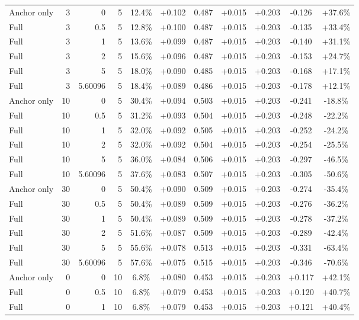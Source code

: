 \begin{table}[htbp]
\begin{tabular}{lrrrccccccc}
Anchor only & 3 & 0 & 5 & 12.4\% & +0.102 & 0.487 & +0.015 & +0.203 & -0.126 & +37.6\% \\
Full & 3 & 0.5 & 5 & 12.8\% & +0.100 & 0.487 & +0.015 & +0.203 & -0.135 & +33.4\% \\
Full & 3 & 1 & 5 & 13.6\% & +0.099 & 0.487 & +0.015 & +0.203 & -0.140 & +31.1\% \\
Full & 3 & 2 & 5 & 15.6\% & +0.096 & 0.487 & +0.015 & +0.203 & -0.153 & +24.7\% \\
Full & 3 & 5 & 5 & 18.0\% & +0.090 & 0.485 & +0.015 & +0.203 & -0.168 & +17.1\% \\
Full & 3 & 5.60096 & 5 & 18.4\% & +0.089 & 0.486 & +0.015 & +0.203 & -0.178 & +12.1\% \\
Anchor only & 10 & 0 & 5 & 30.4\% & +0.094 & 0.503 & +0.015 & +0.203 & -0.241 & -18.8\% \\
Full & 10 & 0.5 & 5 & 31.2\% & +0.093 & 0.504 & +0.015 & +0.203 & -0.248 & -22.2\% \\
Full & 10 & 1 & 5 & 32.0\% & +0.092 & 0.505 & +0.015 & +0.203 & -0.252 & -24.2\% \\
Full & 10 & 2 & 5 & 32.0\% & +0.092 & 0.504 & +0.015 & +0.203 & -0.254 & -25.5\% \\
Full & 10 & 5 & 5 & 36.0\% & +0.084 & 0.506 & +0.015 & +0.203 & -0.297 & -46.5\% \\
Full & 10 & 5.60096 & 5 & 37.6\% & +0.083 & 0.507 & +0.015 & +0.203 & -0.305 & -50.6\% \\
Anchor only & 30 & 0 & 5 & 50.4\% & +0.090 & 0.509 & +0.015 & +0.203 & -0.274 & -35.4\% \\
Full & 30 & 0.5 & 5 & 50.4\% & +0.089 & 0.509 & +0.015 & +0.203 & -0.276 & -36.2\% \\
Full & 30 & 1 & 5 & 50.4\% & +0.089 & 0.509 & +0.015 & +0.203 & -0.278 & -37.2\% \\
Full & 30 & 2 & 5 & 51.6\% & +0.087 & 0.509 & +0.015 & +0.203 & -0.289 & -42.4\% \\
Full & 30 & 5 & 5 & 55.6\% & +0.078 & 0.513 & +0.015 & +0.203 & -0.331 & -63.4\% \\
Full & 30 & 5.60096 & 5 & 57.6\% & +0.075 & 0.515 & +0.015 & +0.203 & -0.346 & -70.6\% \\
Anchor only & 0 & 0 & 10 & 6.8\% & +0.080 & 0.453 & +0.015 & +0.203 & +0.117 & +42.1\% \\
Full & 0 & 0.5 & 10 & 6.8\% & +0.079 & 0.453 & +0.015 & +0.203 & +0.120 & +40.7\% \\
Full & 0 & 1 & 10 & 6.8\% & +0.079 & 0.453 & +0.015 & +0.203 & +0.121 & +40.4\% \\

\end{tabular}
\end{table}
